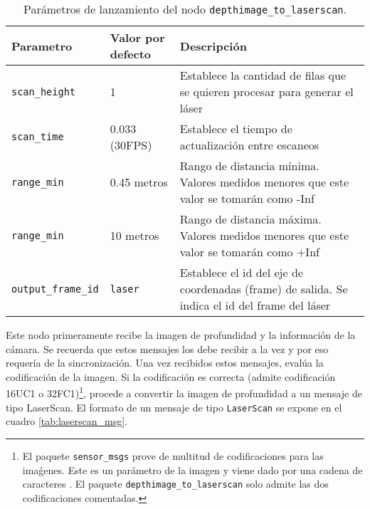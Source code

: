 \begin{table}[H]
\begin{center}
\begin{tabular}{| w{c}{3cm} | w{c}{3cm} | m{7.5cm} |}
	\hline
	Parametro & Valor por defecto & Descripción \\ \hline
	\texttt{scan\_height} & 1 & Establece la cantidad de filas que se quieren procesar para generar el láser \\ \hline
	\texttt{scan\_time} & 0.033 (30FPS) & Establece el tiempo de actualización entre escaneos \\ \hline
	\texttt{range\_min} & 0.45 metros & Rango de distancia mínima. Valores medidos menores que este valor se tomarán como -Inf \\ \hline
	\texttt{range\_min} & 10 metros & Rango de distancia máxima. Valores medidos menores que este valor se tomarán como +Inf \\ \hline
	\texttt{output\_frame\_id} & \texttt{laser} & Establece el id del eje de coordenadas (frame) de salida. Se indica el id del frame del láser \\ \hline
\end{tabular}
\caption{Parámetros de lanzamiento del nodo \texttt{depthimage\_to\_laserscan}.}
\label{tab:param_depthimage}
\end{center}
\end{table} 

Este nodo primeramente recibe la imagen de profundidad y la información de la cámara. Se recuerda que estos mensajes los debe recibir a la vez y por eso requería de la sincronización. Una vez recibidos estos mensajes, evalúa la codificación de la imagen. Si la codificación es correcta (admite codificación 16UC1 o 32FC1)\footnote{El paquete \texttt{sensor\_msgs} prove de multitud de codificaciones para las imaǵenes. Este es un parámetro de la imagen y viene dado por una cadena de caracteres \cite{enc}. El paquete \texttt{depthimage\_to\_laserscan} solo admite las dos codificaciones comentadas.}, procede a convertir la imagen de profundidad a un mensaje de tipo LaserScan. El formato de un mensaje de tipo \texttt{LaserScan} se expone en el cuadro \ref{tab:laserscan_msg}.\\

